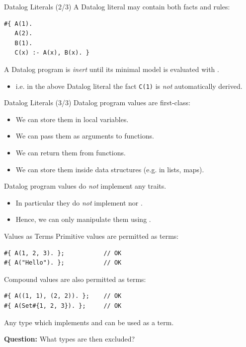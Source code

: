 \begin{frame}[fragile]{Datalog Literals (2/3)}
A Datalog literal may contain both facts and rules:

\begin{lstlisting}[language=flix, xleftmargin=0.8cm]
#{ A(1). 
   A(2). 
   B(1).
   C(x) :- A(x), B(x). }
\end{lstlisting}

A Datalog program is \emph{inert} until its minimal model is evaluated with
. 

\begin{itemize}
    \item i.e. in the above Datalog literal the fact \lstinline{C(1)} is
    \emph{not} automatically derived. 
\end{itemize}
\end{frame}

\begin{frame}[fragile]{Datalog Literals (3/3)}
Datalog program values are first-class:

\begin{itemize}
    \item We can store them in local variables.
    \item We can pass them as arguments to functions.
    \item We can return them from functions.
    \item We can store them inside data structures (e.g. in lists, maps).
\end{itemize}

\pause

Datalog program values do \emph{not} implement any traits.

\begin{itemize}
    \item In particular they do \emph{not} implement  nor .
    \item Hence, we can only manipulate them using .
\end{itemize}
\end{frame}

\begin{frame}[fragile]{Values as Terms}
Primitive values are permitted as terms:

\begin{lstlisting}[language=flix, xleftmargin=0.8cm]
#{ A(1, 2, 3). };           // OK
#{ A("Hello"). };           // OK
\end{lstlisting}

\pause

Compound values are also permitted as terms:

\begin{lstlisting}[language=flix, xleftmargin=0.8cm]
#{ A((1, 1), (2, 2)). };    // OK
#{ A(Set#{1, 2, 3}). };     // OK
\end{lstlisting}

Any type which implements  and  can be used as a
term.

\pause

\textbf{Question:} What types are then excluded?
\end{frame}

